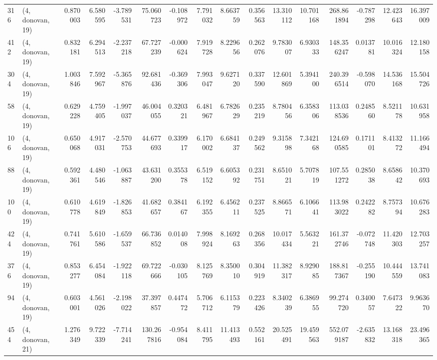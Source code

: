 \begin{tabular}{llrrrrrrrrrrrrrr}
316 &  (4, donovan, 19) &   0.870003 &   6.580595 &  -3.789531 &    75.060723 &  -0.108972 &   7.791032 &   8.663759 &  0.356563 &  13.310112 &  10.701168 &   268.861894 & -0.787298 &  12.423643 &  16.397009 \\
412 &  (4, donovan, 19) &   0.832181 &   6.294513 &  -2.237218 &    67.727239 &  -0.000624 &   7.919728 &   8.229656 &  0.262076 &   9.783007 &   6.930333 &   148.356247 &  0.013781 &  10.016324 &  12.180158 \\
304 &  (4, donovan, 19) &   1.003846 &   7.592967 &  -5.365876 &    92.681436 &  -0.369306 &   7.993047 &   9.627120 &  0.337590 &  12.601869 &   5.394100 &   240.396514 & -0.598070 &  14.536168 &  15.504726 \\
58  &  (4, donovan, 19) &   0.629228 &   4.759405 &  -1.997037 &    46.004055 &   0.320321 &   6.481967 &   6.782629 &  0.235219 &   8.780456 &   6.358306 &   113.038536 &  0.248560 &   8.521178 &  10.631958 \\
106 &  (4, donovan, 19) &   0.650068 &   4.917031 &  -2.570753 &    44.677693 &   0.339917 &   6.170002 &   6.684137 &  0.249562 &   9.315898 &   7.342168 &   124.690585 &  0.171101 &   8.413272 &  11.166494 \\
88  &  (4, donovan, 19) &   0.592361 &   4.480546 &  -1.063887 &    43.631200 &   0.355378 &   6.519152 &   6.605392 &  0.231751 &   8.651021 &   5.707819 &   107.551272 &  0.285038 &   8.658642 &  10.370693 \\
100 &  (4, donovan, 19) &   0.610778 &   4.619849 &  -1.826853 &    41.682657 &   0.384167 &   6.192355 &   6.456211 &  0.237525 &   8.866571 &   6.106641 &   113.983022 &  0.242282 &   8.757394 &  10.676283 \\
424 &  (4, donovan, 19) &   0.741761 &   5.610586 &  -1.659537 &    66.736852 &   0.014008 &   7.998924 &   8.169263 &  0.268356 &  10.017434 &   5.563221 &   161.372746 & -0.072748 &  11.420303 &  12.703257 \\
376 &  (4, donovan, 19) &   0.853277 &   6.454084 &  -1.922118 &    69.722666 &  -0.030105 &   8.125769 &   8.350010 &  0.304919 &  11.382317 &   8.929085 &   188.817367 & -0.255190 &  10.444559 &  13.741083 \\
94  &  (4, donovan, 19) &   0.603001 &   4.561026 &  -2.198022 &    37.397857 &   0.447472 &   5.706712 &   6.115379 &  0.223426 &   8.340239 &   6.386955 &    99.274720 &  0.340057 &   7.647322 &   9.963670 \\
454 &  (4, donovan, 21) &   1.276349 &   9.722339 &  -7.714241 &   130.267816 &  -0.954084 &   8.411795 &  11.413493 &  0.552161 &  20.525491 &  19.459563 &   552.079187 & -2.635832 &  13.168318 &  23.496365 \\

\end{tabular}
